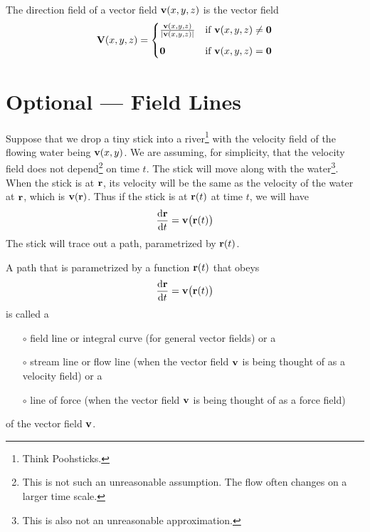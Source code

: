 \begin{defn}\label{def:VFdirnFld}
The direction field of a vector field $\mathbf{v}(x,y,z)$ is the vector field
\begin{equation*}
\mathbf{V}(x,y,z) =\begin{cases}
   \frac{\mathbf{v}(x,y,z)}{|\mathbf{v}(x,y,z)|} &\text{if $\mathbf{v}(x,y,z)\ne\mathbf{0}$} \\[0.1in]
     \mathbf{0} & \text{if $\mathbf{v}(x,y,z) = \mathbf{0}$}
\end{cases}
\end{equation*}
\end{defn}

\section{Optional --- Field Lines}\label{sec:fieldLines}

Suppose that we drop a tiny stick into a river\footnote{Think Poohsticks.
} with the velocity
field of the flowing water being $\mathbf{v}(x,y)$. We are assuming, for 
simplicity, that the velocity field does not depend\footnote{This is not such an unreasonable assumption. The flow often changes on a larger time scale.} 
on time $t$. The stick will move along with the 
water\footnote{This is also not an unreasonable approximation.}. When the stick 
is at $\mathbf{r}$, its velocity will be the same as the velocity of the 
water at $\mathbf{r}$, which is $\mathbf{v}(\mathbf{r})$. Thus if the stick is at 
$\mathbf{r}(t)$ at time $t$, we will have
\begin{equation*}
\diff{\vr}{t} = \vv\big(\vr(t)\big)
\end{equation*}
The stick will trace out a path, parametrized by $\mathbf{r}(t)$. 

\begin{defn}\label{def:fieldLine} 
A path that is parametrized by a function $\mathbf{r}(t)$ that obeys
\begin{equation*}
\diff{\vr}{t} = \vv\big(\vr(t)\big)
\end{equation*}
is called a
\begin{itemize}\itemsep1pt \parskip0pt  %
\item[$\circ$] field line or integral curve (for general vector fields) or a
\item[$\circ$] stream line or flow line (when the vector field $\mathbf{v}$ is
                  being thought of as a velocity field) or a
\item[$\circ$] line of force (when the vector field $\mathbf{v}$ is
                  being thought of as a force field)
\end{itemize}
of the vector field $\mathbf{v}$.
\end{defn}


